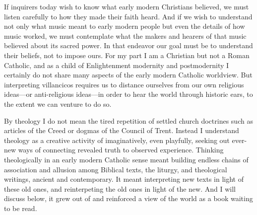 If inquirers today wish to know what early modern Christians believed, we
must listen carefully to how they made their faith heard.
And if we wish to understand not only what music meant to early
modern people but even the details of how music worked, we must contemplate
what the makers and hearers of that music believed about its sacred power. 
In that endeavor our goal must be to understand their beliefs, not to impose
ours.
For my part I am a Christian but not a Roman Catholic, and as a child of
Enlightenment modernity and postmodernity I certainly do not share many aspects
of the early modern Catholic worldview.
But interpreting villancicos requires us to distance ourselves from our own
religious ideas---or anti-religious ideas---in order to hear the world through
historic ears, to the extent we can venture to do so.%

By theology I do not mean the tired repetition of settled church doctrines such
as articles of the Creed or dogmas of the Council of Trent.
Instead I understand theology as a creative activity of imaginatively, even
playfully, seeking out ever-new ways of connecting revealed truth to observed
experience.
Thinking theologically in an early modern Catholic sense meant building 
endless chains of association and allusion among Biblical texts, the liturgy,
and theological writings, ancient and contemporary.
It meant interpreting new texts in light of these old ones, and reinterpeting
the old ones in light of the new.
And I will discuss below, it grew out of and reinforced a view of the world as
a book waiting to be read.

